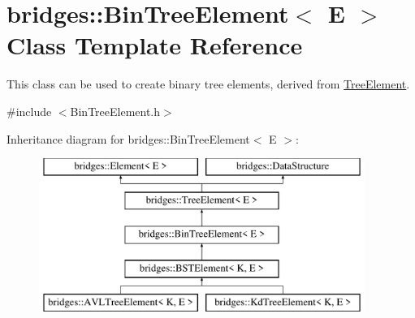 \hypertarget{classbridges_1_1_bin_tree_element}{}\section{bridges\+::Bin\+Tree\+Element$<$ E $>$ Class Template Reference}
\label{classbridges_1_1_bin_tree_element}


This class can be used to create binary tree elements, derived from \mbox{\hyperlink{classbridges_1_1_tree_element}{Tree\+Element}}.  




{\ttfamily \#include $<$Bin\+Tree\+Element.\+h$>$}

Inheritance diagram for bridges\+::Bin\+Tree\+Element$<$ E $>$\+:\begin{figure}[H]
\begin{center}
\leavevmode
\includegraphics[height=5.000000cm]{classbridges_1_1_bin_tree_element}
\end{center}
\end{figure}
